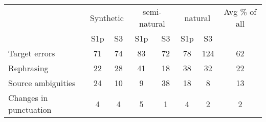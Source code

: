 \begin{tabular}{lccccccc}
 & \multicolumn{2}{c}{Synthetic} & \multicolumn{2}{c}{semi-natural} & \multicolumn{2}{c}{natural} & Avg \% of all \\
& S1p & S3 & S1p & S3 & S1p & S3 & \\\hline
Target errors & 71 & 74 & 83 & 72 & 78 & 124 & 62\\
Rephrasing & 22 & 28 & 41 & 18 & 38 & 32 & 22\\
Source ambiguities & 24 & 10 & 9 & 38 & 18 & 8 & 13\\
Changes in punctuation & 4 & 4 & 5 & 1 & 4 & 2 & 2\\
\end{tabular}